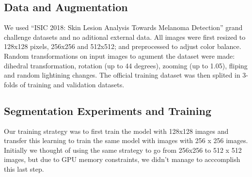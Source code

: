 \documentclass[conference]{IEEEtran}
\begin{document}
\subsection{Data and Augmentation}
We used “ISIC 2018: Skin Lesion Analysis Towards Melanoma Detection” grand challenge datasets \cite{codella, ham} and no aditional external data. All images were first resized to 128x128 pixels, 256x256 and 512x512; and preprocessed to adjust color balance. Random transformations on input images to agument the dataset were made: dihedral transformation, rotation (up to 44 degrees), zooming (up to 1.05), fliping and random lightining changes. The official training dataset was then splited in 3-folds of training and validation datasets.  


\subsection{Segmentation Experiments and Training}
\label{sec:seg_training}
Our training strategy was to first train the model with 128x128 images and transfer this learning to train the same model with images with 256 x 256 images. Initially we thought of using the same strategy to go from 256x256 to 512 x 512 images, but due to GPU memory constraints, we didn't manage to acccomplish this last step.
\end{document}
